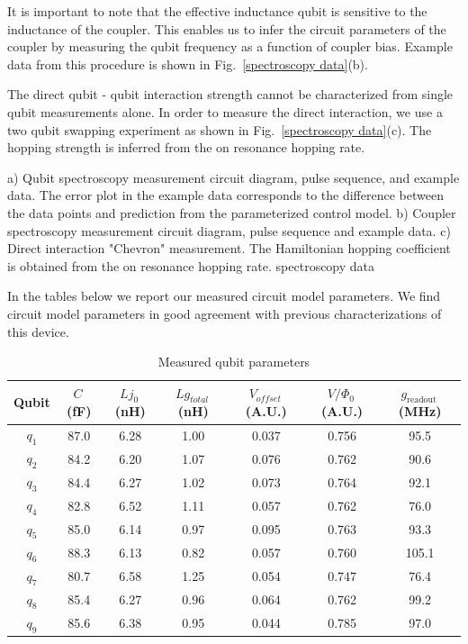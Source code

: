 It is important to note that the effective inductance qubit is sensitive to the inductance of the coupler.
This enables us to infer the circuit parameters of the coupler by measuring the qubit frequency as a function of coupler bias.
Example data from this procedure is shown in Fig.~\ref{spectroscopy data}(b).

The direct qubit - qubit interaction strength cannot be characterized from single qubit measurements alone.
In order to measure the direct interaction, we use a two qubit swapping experiment as shown in Fig.~\ref{spectroscopy data}(c).
The hopping strength is inferred from the on resonance hopping rate.

{
a) Qubit spectroscopy measurement circuit diagram, pulse sequence, and example data.
The error plot in the example data corresponds to the difference between the data points and prediction from the parameterized control model.
b) Coupler spectroscopy measurement circuit diagram, pulse sequence and example data.
c) Direct interaction "Chevron" measurement.  The Hamiltonian hopping coefficient is obtained from the on resonance hopping rate.
}
{spectroscopy data}

In the tables below we report our measured circuit model parameters.
We find circuit model parameters in good agreement with previous characterizations of this device.\cite{Neill2018}
\begin{table}
    \caption{Measured qubit parameters}
    \centering
    \begin{tabular}{ c c c c c c c}
        \hline \hline
        Qubit & $C$\,(fF) & $Lj_{0}$\,(nH)& $Lg_{total}$\,(nH)& $V_{offset}$\,(A.U.)& $V/ \Phi_{0}$\,(A.U.) & $g_{\text{readout}}$\,(MHz) \\
        \hline
        $q_1$ & 87.0 & 6.28 & 1.00 & 0.037 & 0.756 & 95.5 \\
        $q_2$ & 84.2 & 6.20 & 1.07 & 0.076 & 0.762 & 90.6  \\
        $q_3$ & 84.4 & 6.27 & 1.02 & 0.073 & 0.764 & 92.1  \\
        $q_4$ & 82.8 & 6.52 & 1.11 & 0.057 & 0.762 & 76.0  \\
        $q_5$ & 85.0 & 6.14 & 0.97 & 0.095 & 0.763 & 93.3  \\
        $q_6$ & 88.3 & 6.13 & 0.82 & 0.057 & 0.760 & 105.1 \\
        $q_7$ & 80.7 & 6.58 & 1.25 & 0.054 & 0.747 & 76.4  \\
        $q_8$ & 85.4 & 6.27 & 0.96 & 0.064 & 0.762 & 99.2  \\
        $q_9$ & 85.6 & 6.38 & 0.95 & 0.044 & 0.785 & 97.0  \\
        \hline
    \end{tabular}
    \label{table:Qubit Parameters}
\end{table}

